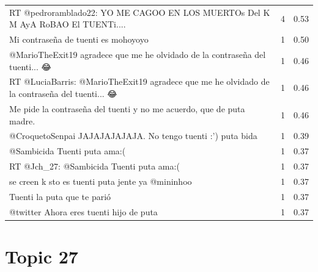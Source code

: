 \begin{longtable}{p{12.5cm}rr}
RT @pedroramblado22: YO ME CAGOO EN LOS MUERTOs Del K M AyA RoBAO El TUENTi.... & 4 & 0.53 \\
Mi contraseña de tuenti es mohoyoyo & 1 & 0.50 \\
@MarioTheExit19 agradece que me he olvidado de la contraseña del tuenti... 😂 & 1 & 0.46 \\
RT @LuciaBarris: @MarioTheExit19 agradece que me he olvidado de la contraseña del tuenti... 😂 & 1 & 0.46 \\
Me pide la contraseña del tuenti y no me acuerdo, que de puta madre. & 1 & 0.46 \\
@CroquetoSenpai JAJAJAJAJAJA. No tengo tuenti :') puta bida & 1 & 0.39 \\
@Sambicida Tuenti puta ama:( & 1 & 0.37 \\
RT @Jch\_27: @Sambicida Tuenti puta ama:( & 1 & 0.37 \\
se creen k sto es tuenti puta jente ya @mininhoo & 1 & 0.37 \\
Tuenti la puta que te parió & 1 & 0.37 \\
@twitter Ahora eres tuenti hijo de puta & 1 & 0.37 \\

\end{longtable}
\clearpage

\section{Topic 27}

